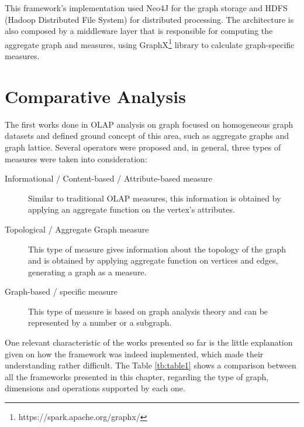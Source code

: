 This framework's implementation used Neo4J for the graph storage and HDFS  (Hadoop Distributed File System) for distributed processing. The architecture is also composed by a middleware layer that is responsible for computing the aggregate graph and measures, using GraphX\footnote{https://spark.apache.org/graphx/} library to calculate graph-specific measures.

\section{Comparative Analysis}

The first works done in OLAP analysis on graph focused on homogeneous graph datasets and defined ground concept of this area, such as aggregate graphs and graph lattice. Several operators were proposed and, in general, three types of measures were taken into consideration:
\begin{description}
\item[Informational / Content-based / Attribute-based measure] Similar to traditional OLAP measures, this information is obtained by applying an aggregate function on the vertex's attributes.
\item[Topological / Aggregate Graph measure]  This type of measure gives information about the topology of the graph and is obtained by applying aggregate function on vertices and edges, generating a graph as a measure.
\item[Graph-based / specific measure] This type of measure is based on graph analysis theory and can be represented by a number or a subgraph.
\end{description}

One relevant characteristic of the works presented so far is the little explanation given on how the framework was indeed implemented, which made their understanding rather difficult. The Table \ref{tb:table1} shows a comparison between all the frameworks presented in this chapter, regarding the type of graph, dimensions and operations supported by each one.

